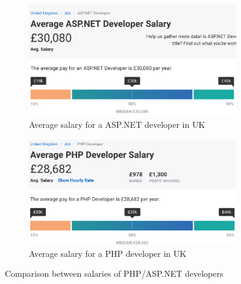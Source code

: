 \documentclass[11]{article}
\begin{document}
		\begin{figure}[H]
				\centering
						\begin{subfigure}{.5\textwidth}
						  \centering
						  \includegraphics[scale=0.45]{aspSalary}
						  \caption{Average salary for a ASP.NET developer in UK}
						  \label{fig:sub1}
						\end{subfigure}%

						\begin{subfigure}{.5\textwidth}
						  \centering
						  \includegraphics[scale=0.45]{phpSalary}
						  \caption{Average salary for a PHP developer in UK}
						  \label{fig:sub2}
						\end{subfigure}

				\caption{Comparison between salaries of PHP/ASP.NET developers}
				\label{salaryComp}
		\end{figure}
	
\end{document}
